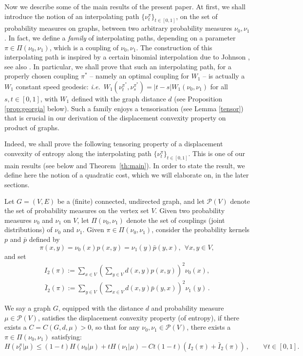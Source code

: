 \documentclass[11pt]{amsart}
\numberwithin{equation}{section}
\begin{document}
\bigskip
Now we describe some of the main results of the present paper.
At first, we shall introduce the notion of an interpolating path $\{\nu_t^\pi\}_{t\in [0,1]}$, on the set of probability measures on graphs, between two arbitrary probability measures $\nu_0, \nu_1$. In fact,  we define a {\em family} of interpolating paths, depending on a parameter $\pi \in \Pi(\nu_0,\nu_1)$, which is a coupling of $\nu_0, \nu_1$. The construction of this interpolating path is inspired by a  certain binomial interpolation due to  Johnson \cite{johnson}, see also \cite{hillionthesis,hillion,hillion-johnson}.
In particular, we shall prove that such an interpolating path, for a properly chosen coupling $\pi^*$ -- namely an optimal coupling for $W_1$ -- is actually a $W_1$ constant speed geodesic: \textit{i.e.}\ $W_1(\nu_t^{\pi^*},\nu_s^{\pi^*})=|t-s|W_1(\nu_0,\nu_1)$ for all $s,t \in [0,1]$, with $W_1$ defined with the graph distance $d$ (see Proposition \ref{prop:georgia} below). 
Such a family enjoys a tensorisation (see Lemma \ref{tensor}) that is crucial in our derivation of the displacement convexity property on product of graphs.

Indeed, we shall prove the following tensoring property of a displacement convexity of entropy along the interpolating path $\{\nu_t^\pi\}_{t\in [0,1]}$. This is one of our main results (see below and  Theorem~\ref{th:main}). In order to state the result, we define here the notion of a quadratic cost, which we will elaborate on, in the later sections.

Let $G=(V,E)$ be a (finite) connected, undirected graph, and let $\mathcal{P}(V)$ denote the set of probability measures on the vertex set $V$.  Given two probability measures $\nu_0$ and $\nu_1$ on $V$, let $\Pi(\nu_0, \nu_1)$ denote the set of couplings (joint distributions) of $\nu_0$ and $\nu_1$. 
Given $\pi \in \Pi(\nu_0,\nu_1)$, consider the probability kernels 
$p$ and $\bar{p}$ 
defined by $$\pi(x,y)=\nu_0(x)p(x,y) = \nu_{1}(y)\bar{p}(y,x), \ \ \forall x,y \in V, $$ and set
\begin{eqnarray}
I_2(\pi):=  \sum_{x \in V} \left( \sum_{y \in V} d(x,y) p(x,y) \right)^2 \nu_0(x),
\end{eqnarray}
\begin{eqnarray*}
\bar{I}_2(\pi):=  \sum_{y \in V} \left( \sum_{x \in V} d(x,y) \bar{p}(y,x) \right)^2 \nu_1(y)\,.
\end{eqnarray*}

We say a graph $G$, equipped with the distance $d$ and probability measure $\mu\in \mathcal{P}(V)$, satisfies the displacement convexity property (of entropy), if there exists a $C = C(G, d, \mu) > 0$, so that for any $\nu_0, \nu_1 \in \mathcal{P}(V)$,  there exists a $\pi\in \Pi(\nu_0, \nu_1)$ satisfying:
$$
H(\nu_t^\pi | \mu) \leq (1-t)H(\nu_0 | \mu) + tH(\nu_1 | \mu) - C t(1-t)(I_2(\pi)+\bar{I}_2(\pi))\,, \qquad \forall t\in [0,1].
$$
\end{document}
